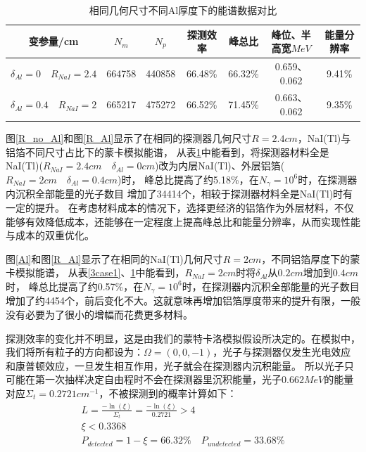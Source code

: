 \documentclass{article}
\begin{document}
\begin{table}[h]
    \centering
    \caption{相同几何尺寸不同Al厚度下的能谱数据对比}
    \begin{tabular}{ccccccc}
        \hline
        变参量/cm & $N_m$ & $N_p$ & 探测效率 & 峰总比 & 峰位、半高宽$MeV$ &能量分辨率 \\
        \hline
        $\delta _{Al}=0\quad R_{NaI}=2.4$ & 664758 & 440858 & 66.48\% & 66.32\% & 0.659、0.062 &9.41\%  \\

        $\delta _{Al}=0.4\quad R_{NaI}=2$ & 665217 & 475272 & 66.52\% & 71.45\% & 0.663、0.062 &9.35\%  \\
        
        \hline
    \end{tabular}
    \label{2case1}
\end{table}

图\ref{R_no_Al}和图\ref{R_Al}显示了在相同的探测器几何尺寸$R=2.4cm$，NaI(Tl)与铝箔不同尺寸占比下的蒙卡模拟能谱，
从表\ref{2case1}中能看到，将探测器材料全是NaI(Tl)($R_{NaI}=2.4cm\quad \delta _{Al}=0cm$)改为内层NaI(Tl)、外层铝箔($R_{NaI}=2cm\quad \delta _{Al}=0.4cm$)时，
峰总比提高了约5.18\%，在$N_{\gamma }=10^6$时，在探测器内沉积全部能量的光子数目
增加了34414个，相较于探测器材料全是NaI(Tl)时有一定的提升。
在考虑材料成本的情况下，选择更经济的铝箔作为外层材料，不仅能够有效降低成本，还能够在一定程度上提高峰总比和能量分辨率，从而实现性能与成本的双重优化。

图\ref{Al}和图\ref{R_Al}显示了在相同的NaI(Tl)几何尺寸$R=2cm$，不同铝箔厚度下的蒙卡模拟能谱，
从表\ref{3case1}、\ref{2case1}中能看到，$R_{NaI}=2cm$时将$\delta _{Al}$从$0.2cm$增加到$0.4cm$时，
峰总比提高了约0.57\%，在$N_{\gamma }=10^6$时，在探测器内沉积全部能量的光子数目
增加了约4454个，前后变化不大。这就意味再增加铝箔厚度带来的提升有限，一般没有必要为了很小的增幅而花费更多材料。

探测效率的变化并不明显，这是由我们的蒙特卡洛模拟假设所决定的。在模拟中，我们将所有粒子的方向都设为：$\varOmega =(0,0,-1)$，光子与探测器仅发生光电效应和康普顿效应，一旦发生相互作用，光子就会在探测器内沉积能量。
所以光子只可能在第一次抽样决定自由程时不会在探测器里沉积能量，光子$0.662MeV$的能量对应$\Sigma_t=0.2721cm^{-1}$，不被探测到的概率计算如下：
\begin{equation}
    \begin{gathered}
        L=\frac{-\ln(\xi)}{\Sigma_t} =\frac{-\ln(\xi)}{0.2721} >4\\
        \xi<0.3368\\
        P_{detected}=1-\xi=66.32\%\quad P_{undetected}=33.68\%
    \end{gathered}
    \label{Pdetected}
\end{equation}
\end{document}

